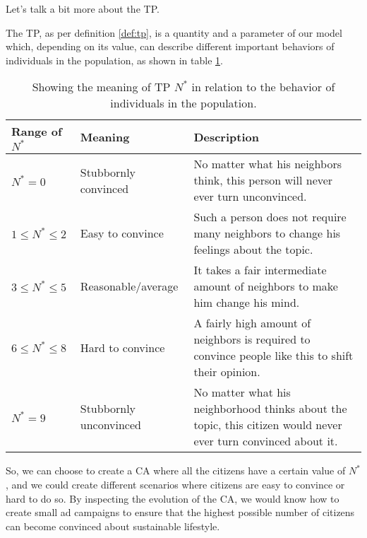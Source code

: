 Let's talk a bit more about the TP.

\begin{proposition}
The TP, as per definition \ref{def:tp}, is a quantity and a parameter of our model which,
depending on its value, can describe different important behaviors of individuals in the population,
as shown in table \ref{tab:meaningn}.
\end{proposition}

%
\begin{table}[h]
  \footnotesize%
  \begin{center}
    \begin{tabular}{p{}p{}p{}}
      \toprule
      Range of $N^\ast$ & Meaning & Description \\
      \midrule
      $N^\ast = 0$ & Stubbornly convinced & No matter what his
      neighbors think, this person will never ever turn unconvinced.\\
      $1 \leq N^\ast \leq 2$ & Easy to convince  & Such a person does not
      require many neighbors to change his feelings about the topic.\\
      $3 \leq N^\ast \leq 5$ & Reasonable/average & It takes a fair
      intermediate amount of neighbors to make him change his mind.\\
      $6 \leq N^\ast \leq 8$ & Hard to convince & A fairly high amount of
      neighbors is required to convince people like this to shift their opinion.\\
      $N^\ast = 9$ & Stubbornly unconvinced & No matter what his
      neighborhood thinks about the topic, this citizen would never ever turn convinced about it.\\
      \bottomrule
    \end{tabular}
  \end{center}
  \caption[Meaning of Turning Point]{Showing the meaning of TP $N^\ast$ in relation to the behavior of individuals
in the population.}
  \label{tab:meaningn}
\end{table}
%

So, we can choose to create a CA where all the citizens have a certain value of $N^\ast$, and
we could create different scenarios where citizens are easy to convince or hard to do so.
By inspecting the evolution of the CA, we would know how to create small ad campaigns to ensure
that the highest possible number of citizens can become convinced about sustainable lifestyle.

